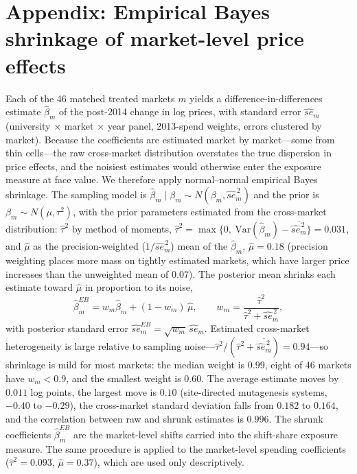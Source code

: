 \documentclass[11pt]{article}
\begin{document}
\section*{Appendix: Empirical Bayes shrinkage of market-level price effects}

Each of the 46 matched treated markets $m$ yields a difference-in-differences
estimate $\hat\beta_m$ of the post-2014 change in log prices, with standard
error $\widehat{se}_m$ (university $\times$ market $\times$ year panel,
2013-spend weights, errors clustered by market). Because the coefficients are
estimated market by market---some from thin cells---the raw cross-market
distribution overstates the true dispersion in price effects, and the noisiest
estimates would otherwise enter the exposure measure at face value. We
therefore apply normal--normal empirical Bayes shrinkage. The sampling model
is $\hat\beta_m \mid \beta_m \sim N(\beta_m, \widehat{se}_m^{\,2})$ and the
prior is $\beta_m \sim N(\mu, \tau^2)$, with the prior parameters estimated
from the cross-market distribution: $\hat\tau^2$ by method of moments,
$\hat\tau^2 = \max\{0,\ \mathrm{Var}(\hat\beta_m) -
\overline{\widehat{se}_m^{\,2}}\} = 0.031$, and $\hat\mu$ as the
precision-weighted ($1/\widehat{se}_m^{\,2}$) mean of the $\hat\beta_m$,
$\hat\mu = 0.18$ (precision weighting places more mass on tightly estimated
markets, which have larger price increases than the unweighted mean of
$0.07$). The posterior mean shrinks each estimate toward $\hat\mu$ in
proportion to its noise,
\[
\hat\beta^{EB}_m = w_m \hat\beta_m + (1 - w_m)\,\hat\mu,
\qquad
w_m = \frac{\hat\tau^2}{\hat\tau^2 + \widehat{se}_m^{\,2}},
\]
with posterior standard error $\widehat{se}^{EB}_m = \sqrt{w_m}\,
\widehat{se}_m$. Estimated cross-market heterogeneity is large relative to
sampling noise---$\hat\tau^2 / (\hat\tau^2 +
\overline{\widehat{se}_m^{\,2}}) = 0.94$---so shrinkage is mild for most
markets: the median weight is $0.99$, eight of 46 markets have $w_m < 0.9$,
and the smallest weight is $0.60$. The average estimate moves by $0.011$ log
points, the largest move is $0.10$ (site-directed mutagenesis systems,
$-0.40$ to $-0.29$), the cross-market standard deviation falls from $0.182$
to $0.164$, and the correlation between raw and shrunk estimates is $0.996$.
The shrunk coefficients $\hat\beta^{EB}_m$ are the market-level shifts carried
into the shift-share exposure measure. The same procedure is applied to the
market-level spending coefficients ($\hat\tau^2 = 0.093$, $\hat\mu = 0.37$),
which are used only descriptively.
\end{document}
